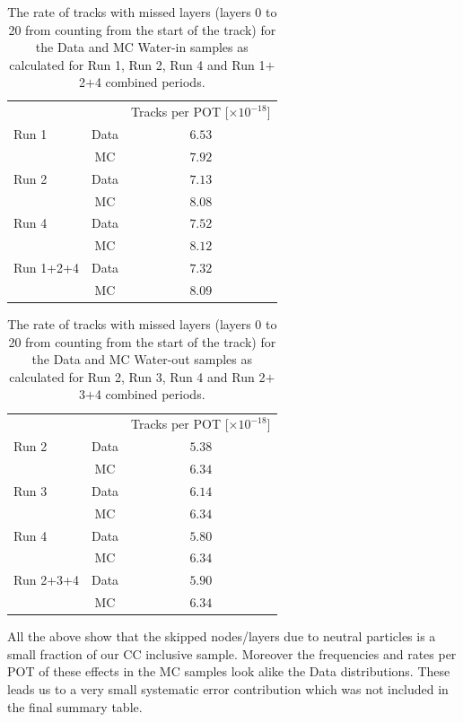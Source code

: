 \begin{table}[h]
\centering
\begin{tabular}{lcc}\toprule
      & &  Tracks per POT [$\times 10^{-18}$] \\
\cline{2-3}
Run 1 & Data & $6.53$  \\ 
      & MC & $7.92$ \\ 
\cline{2-3}
Run 2 & Data & $7.13$  \\ 
      & MC & $8.08$ \\ 
\cline{2-3}
Run 4 & Data & $7.52$  \\ 
      & MC & $8.12$ \\ 
\cline{2-3}
Run 1+2+4 & Data & $7.32$  \\ 
      & MC & $8.09$ \\ 
\bottomrule
\end{tabular}
\caption{The rate of tracks
with missed layers (layers 0 to 20 from counting from the start of the track)
for the Data and MC Water-in samples 
as calculated for Run 1, Run 2, Run 4 and Run 1$+$2$+$4 combined periods.
}
\label{tab:TracksWithMiss0to20perPTWaterIn}
\end{table}

\begin{table}[h]
\centering
\begin{tabular}{lcc}\toprule
      & &  Tracks per POT [$\times 10^{-18}$] \\
\cline{2-3}
Run 2 & Data & $5.38$  \\ 
      & MC & $6.34$ \\ 
\cline{2-3}
Run 3 & Data & $6.14$  \\ 
      & MC & $6.34$ \\ 
\cline{2-3}
Run 4 & Data & $5.80$  \\ 
      & MC & $6.34$ \\ 
\cline{2-3}
Run 2+3+4 & Data & $5.90$  \\ 
      & MC & $6.34$ \\ 
\bottomrule
\end{tabular}
\caption{The rate of tracks
with missed layers (layers 0 to 20 from counting from the start of the track)
for the Data and MC Water-out samples 
as calculated for Run 2, Run 3, Run 4 and Run 2$+$3$+$4 combined periods.
}
\label{tab:TracksWithMiss0to20perPTWaterOut}
\end{table}

All the above show that the skipped nodes/layers due to neutral particles 
is a small fraction of our CC inclusive sample. 
Moreover the frequencies and rates per POT of these effects 
in the MC samples look alike the Data distributions. 
These leads us to a very small systematic error contribution 
which was not included in the final summary table.


